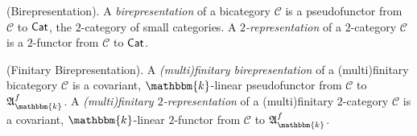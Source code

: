 


\noindent\begin{definition}\textnormal{(Birepresentation).} A {\em birepresentation} of a bicategory $\mathscr{C}$ is a pseudofunctor from $\mathscr{C}$ to $\textnormal{\textsf{Cat}}$, the $2$-category of small categories. A {\em $2$-representation} of a $2$-category $\mathscr{C}$ is a $2$-functor from $\mathscr{C}$ to $\textnormal{\textsf{Cat}}$.\\
\end{definition}

\noindent\begin{definition}\textnormal{(Finitary Birepresentation).} A {\em (multi)finitary birepresentation} of a (multi)finitary bicategory $\mathscr{C}$ is a covariant, $\mathbbm{k}$-linear pseudofunctor from $\mathscr{C}$ to $\mathfrak{A}_\mathbbm{k}^f$. A {\em (multi)finitary $2$-representation} of a (multi)finitary $2$-category $\mathscr{C}$ is a covariant, $\mathbbm{k}$-linear $2$-functor from $\mathscr{C}$ to $\mathfrak{A}_\mathbbm{k}^f$.\\
\end{definition}

